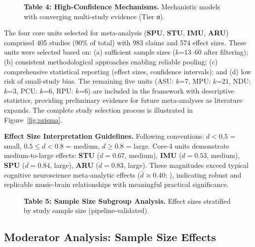 \documentclass[9pt,onecolumn]{article}
\newcommand{\STU}{\textcolor{stucolor}{\textbf{STU}}}
\newcommand{\IMU}{\textcolor{imucolor}{\textbf{IMU}}}
\newcommand{\SPU}{\textcolor{spucolor}{\textbf{SPU}}}
\newcommand{\ARU}{\textcolor{arucolor}{\textbf{ARU}}}
\begin{document}
\begin{figure}[H]
\centering
\vspace{0.2em}
{\fontsize{7}{8.4}\selectfont\textbf{Table 4: High-Confidence Mechanisms.} Mechanistic models with converging multi-study evidence (Tier α).}
\label{tab:high-confidence}
\end{figure}

\vspace{-0.2em}
The four core units selected for meta-analysis (\SPU{}, \STU{}, \IMU{}, \ARU{}) comprised 405 studies (90\% of total) with 983 claims and 574 effect sizes. These units were selected based on: (a) sufficient sample sizes ($k$=13--60 after filtering); (b) consistent methodological approaches enabling reliable pooling; (c) comprehensive statistical reporting (effect sizes, confidence intervals); and (d) low risk of small-study bias. The remaining five units (ASU: $k$=7, MPU: $k$=21, NDU: $k$=3, PCU: $k$=6, RPU: $k$=6) are included in the framework with descriptive statistics, providing preliminary evidence for future meta-analyses as literature expands. The complete study selection process is illustrated in Figure~\ref{fig:prisma}.

\vspace{-0.2em}
\textbf{Effect Size Interpretation Guidelines.} Following \citet{borenstein2021} conventions: $d < 0.5$ = small, $0.5 \leq d < 0.8$ = medium, $d \geq 0.8$ = large. Core-4 units demonstrate medium-to-large effects: \STU{} ($d=0.67$, medium), \IMU{} ($d=0.53$, medium), \SPU{} ($d=0.84$, large), \ARU{} ($d=0.83$, large). These magnitudes exceed typical cognitive neuroscience meta-analytic effects ($\bar{d} \approx 0.40$; \citealt{hedges1998}), indicating robust and replicable music-brain relationships with meaningful practical significance.

\begin{figure}[H]
\centering
\vspace{0.2em}
{\fontsize{7}{8.4}\selectfont\textbf{Table 5: Sample Size Subgroup Analysis.} Effect sizes stratified by study sample size (pipeline-validated).}
\label{tab:sample-size}
\end{figure}


\clearpage
\onecolumn

\subsection{Moderator Analysis: Sample Size Effects}
\end{document}
